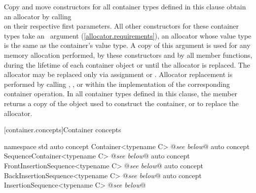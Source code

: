 \documentclass[american,twoside]{book}
\begin{document}
\setcounter{Paras}{8}
\pnum
Copy and move constructors for all container types defined in this
clause  obtain an allocator by calling\\
on their respective first parameters. All other constructors for these
container types take an \ argument
(\ref{allocator.requirements}), an allocator whose value type is the
same as the container's value type. A copy of this argument is used
for any memory allocation performed, by these constructors and by all
member functions, during the lifetime of each container object or
until the allocator is replaced. The allocator may be replaced only
via assignment or . Allocator replacement is performed
by calling
,
, or
within the implementation of the corresponding container operation. In
all container types defined in this clause, the member
 returns a copy of the  object
used to construct the container, or to replace the allocator. 

\color{addclr}
[container.concepts]{Container concepts}
\pnum
{} 


\begin{codeblock}
namespace std {
  auto concept Container<typename C> @\textit{see below}@
  auto concept SequenceContainer<typename C> @\textit{see below}@
  auto concept FrontInsertionSequence<typename C> @\textit{see below}@
  auto concept BackInsertionSequence<typename C> @\textit{see below}@
  auto concept InsertionSequence<typename C> @\textit{see below}@
}
\end{codeblock}
\end{document}
